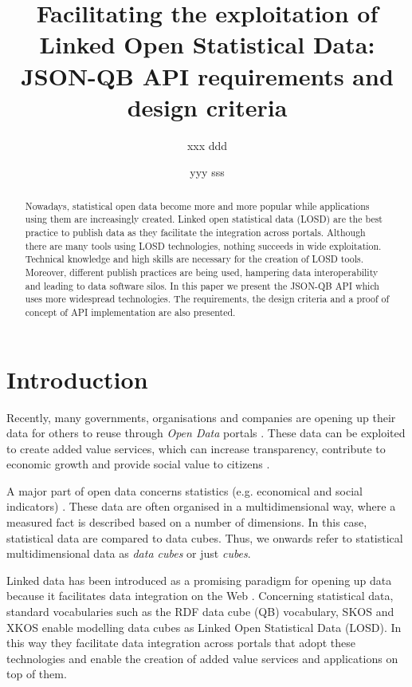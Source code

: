 \documentclass{llncs}
\begin{document}
\title{Facilitating the exploitation of Linked Open Statistical Data: JSON-QB API requirements and design criteria}

\author{xxx ddd \and yyy sss}

\maketitle

\begin{abstract}

Nowadays, statistical open data become more and more popular while applications using them are increasingly created. Linked open statistical data (LOSD) are the best practice to publish data as they facilitate the integration across portals. Although there are many tools using LOSD technologies, nothing succeeds in wide exploitation. Technical knowledge and high skills are necessary for the creation of LOSD tools. Moreover, different publish practices are being used, hampering data interoperability and leading to data software silos. In this paper we present the JSON-QB API which uses more widespread technologies. The requirements, the design criteria and a proof of concept of API implementation are also presented.  

\end{abstract}

\section{Introduction}\label{sec:intro}

Recently, many governments, organisations and companies are opening up their data for others to reuse through \textit{Open Data} portals  \cite{Kalampokis:2011:IJWET}. These data can be exploited to create added value services, which can increase transparency, contribute to economic growth and provide social value to citizens \cite{Janssen:2012}.

A major part of open data concerns statistics (e.g. economical and social indicators) \cite{Capadisli:2013}. These data are often organised in a multidimensional way, where a measured fact is described based on a number of dimensions. In this case, statistical data are compared to data cubes. Thus, we onwards refer to statistical multidimensional data as \textit{data cubes} or just \textit{cubes}.

Linked data has been introduced as a promising paradigm for opening up data because it facilitates data integration on the Web \cite{Bizer:2009}. Concerning statistical data, standard vocabularies such as the RDF data cube (QB) vocabulary\cite{Cyganiak:2014:W3C}, SKOS\cite{Miles:2009:W3C} and XKOS\cite{XKOS} enable modelling data cubes as Linked Open Statistical Data (LOSD). In this way they facilitate data integration across portals that adopt these technologies and enable the creation of added value services and applications on top of them.
\end{document}
